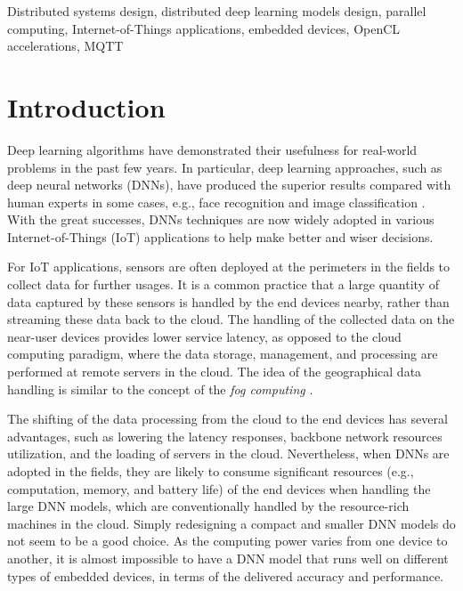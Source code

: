 \documentclass[conference]{IEEEtran}
\begin{document}
\begin{IEEEkeywords}
Distributed systems design, distributed deep learning models design, parallel computing, Internet-of-Things applications, embedded devices, OpenCL accelerations, MQTT
\end{IEEEkeywords}

\section{Introduction}

Deep learning algorithms have demonstrated their usefulness for real-world problems in the past few years. In particular, deep learning approaches, such as deep neural networks (DNNs), have produced the superior results compared with human experts in some cases, e.g., face recognition and image classification \cite{Ciregan2012}. With the great successes, DNNs techniques are now widely adopted in various Internet-of-Things (IoT) applications to help make better and wiser decisions.

For IoT applications, sensors are often deployed at the perimeters in the fields to collect data for further usages. It is a common practice that a large quantity of data captured by these sensors is handled by the end devices nearby, rather than streaming these data back to the cloud. The handling of the collected data on the near-user devices provides lower service latency, as opposed to the cloud computing paradigm, where the data storage, management, and processing are performed at remote servers in the cloud. The idea of the geographical data handling is similar to the concept of the \emph{fog computing} \cite{bonomi2014fog}.

The shifting of the data processing from the cloud to the end devices has several advantages, such as lowering the latency responses, backbone network resources utilization, and the loading of servers in the cloud. Nevertheless, when DNNs are adopted in the fields, they are likely to consume significant resources (e.g., computation, memory, and battery life) of the end devices when handling the large DNN models, which are conventionally handled by the resource-rich machines in the cloud. Simply redesigning a compact and smaller DNN models do not seem to be a good choice. As the computing power varies from one device to another, it is almost impossible to have a DNN model that runs well on different types of embedded devices, in terms of the delivered accuracy and performance.
\end{document}
